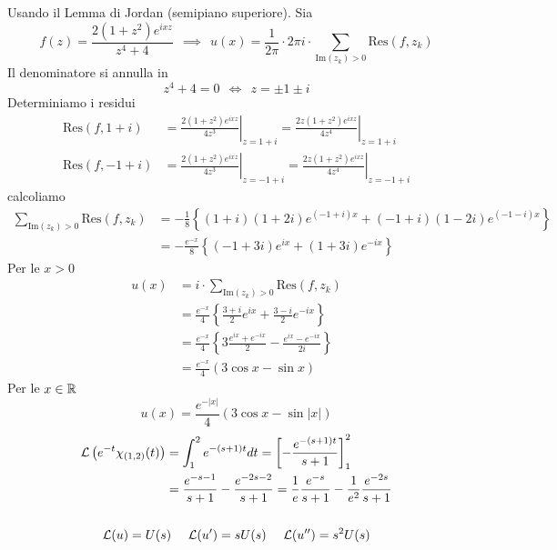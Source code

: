 Usando il Lemma di Jordan (semipiano superiore). Sia
\begin{equation*}
f( z) =\frac{2\left( 1+z^{2}\right) e^{ixz}}{z^{4} +4} \ \ \implies \ \ u( x) =\frac{1}{2\pi } \cdotp 2\pi i\cdotp \sum _{\mathrm{Im}( z_{k})  >0}\mathrm{Res}( f,z_{k})
\end{equation*}
Il denominatore si annulla in
\begin{equation*}
z^{4} +4=0\ \ \iff \ \ z=\pm 1\pm i
\end{equation*}
Determiniamo i residui
\begin{align*}
\mathrm{Res}( f,1+i) & =\left. \frac{2\left( 1+z^{2}\right) e^{ixz}}{4z^{3}}\right| _{z=1+i} =\left. \frac{2z\left( 1+z^{2}\right) e^{ixz}}{4z^{4}}\right| _{z=1+i}\\
\mathrm{Res}( f,-1+i) & =\left. \frac{2\left( 1+z^{2}\right) e^{ixz}}{4z^{3}}\right| _{z=-1+i} =\left. \frac{2z\left( 1+z^{2}\right) e^{ixz}}{4z^{4}}\right| _{z=-1+i}
\end{align*}
calcoliamo
\begin{align*}
\sum _{\mathrm{Im}( z_{k})  >0}\mathrm{Res}( f,z_{k}) & =-\frac{1}{8}\left\{( 1+i)( 1+2i) e^{( -1+i) x} +( -1+i)( 1-2i) e^{( -1-i) x}\right\}\\
 & =-\frac{e^{-x}}{8}\left\{( -1+3i) e^{ix} +( 1+3i) e^{-ix}\right\}
\end{align*}
Per le $x >0$
\begin{align*}
u( x) & =i\cdotp \sum _{\mathrm{Im}( z_{k})  >0}\mathrm{Res}( f,z_{k})\\
 & =\frac{e^{-x}}{4}\left\{\frac{3+i}{2} e^{ix} +\frac{3-i}{2} e^{-ix}\right\}\\
 & =\frac{e^{-x}}{4}\left\{3\frac{e^{ix} +e^{-ix}}{2} -\frac{e^{ix} -e^{-ix}}{2i}\right\}\\
 & =\frac{e^{-x}}{4}( 3\cos x-\sin x)
\end{align*}
Per le $x\in \mathbb{R} $
\begin{equation*}
u( x) =\frac{e^{-| x| }}{4}( 3\cos x-\sin| x| )
\end{equation*}
\Soluzione
\begin{gather*}
\begin{aligned}
\mathcal{L}\left( e^{-t} \chi _{( 1,2)}( t)\right) & =\int ^{2}_{1} e^{-( s+1) t} dt=\left[ -\frac{e^{-( s+1) t}}{s+1}\right]^{2}_{1}\\
 & =\frac{e^{-s-1}}{s+1} -\frac{e^{-2s-2}}{s+1} =\frac{1}{e}\frac{e^{-s}}{s+1} -\frac{1}{e^{2}}\frac{e^{-2s}}{s+1}
\end{aligned}\\
\\
\mathcal{L}( u) =U( s) \ \ \ \ \mathcal{L}( u') =sU( s) \ \ \ \ \mathcal{L}( u'') =s^{2} U( s)
\end{gather*}
